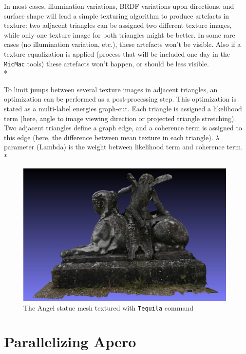 In most cases, illumination variations, BRDF variations upon directions, and surface shape will lead a simple texturing algorithm to produce artefacts in texture: two adjacent triangles can be assigned two different texture images, while only one texture image for both triangles might be better.
In some rare cases (no illumination variation, etc.), these artefacts won't be visible. Also if a texture equalization is applied (process that will be included one day in the {\tt MicMac} tools) these artefacts won't happen, or should be less visible.\\*

To limit jumps between several texture images in adjacent triangles, an optimization can be performed as a post-processing step. This optimization is stated as a multi-label energies graph-cut.
Each triangle is assigned a likelihood term (here, angle to image viewing direction or projected triangle stretching).
Two adjacent triangles define a graph edge, and a coherence term is assigned to this edge (here, the difference between mean texture in each triangle).
$\lambda$ parameter (Lambda) is the weight between likelihood term and coherence term.\\*

\begin{figure}[H]
\begin{center}
\includegraphics[width=110mm]{FIGS/Ange/Tequila.jpg}
\end{center}
\caption{The Angel statue mesh textured with {\tt Tequila} command}
\label{FIG:Angel:Tequila}
\end{figure}

\section{Parallelizing Apero}


